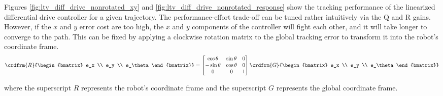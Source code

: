 Figures \ref{fig:ltv_diff_drive_nonrotated_xy} and
\ref{fig:ltv_diff_drive_nonrotated_response} show the tracking performance of
the linearized differential drive controller for a given trajectory. The
performance-effort trade-off can be tuned rather intuitively via the Q and R
gains. However, if the $x$ and $y$ error cost are too high, the $x$ and $y$
components of the controller will fight each other, and it will take longer to
converge to the path. This can be fixed by applying a clockwise rotation matrix
to the global tracking error to transform it into the robot's coordinate frame.
\begin{equation*}
  \crdfrm{R}{\begin{bmatrix}
    e_x \\
    e_y \\
    e_\theta
  \end{bmatrix}} =
  \begin{bmatrix}
    \cos\theta & \sin\theta & 0 \\
    -\sin\theta & \cos\theta & 0 \\
    0 & 0 & 1
  \end{bmatrix}
  \crdfrm{G}{\begin{bmatrix}
    e_x \\
    e_y \\
    e_\theta
  \end{bmatrix}}
\end{equation*}

where the superscript $R$ represents the robot's coordinate frame and the
superscript $G$ represents the global coordinate frame.

